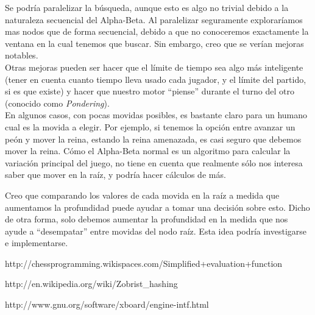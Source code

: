 \documentclass{article}
\begin{document}
Se podría paralelizar la búsqueda, aunque esto es algo no trivial
debido a la naturaleza secuencial del Alpha-Beta. Al paralelizar
seguramente exploraríamos mas nodos que de forma secuencial, debido a
que no conoceremos exactamente la ventana en la cual tenemos que buscar.
Sin embargo, creo que se verían mejoras notables.
\\

Otras mejoras pueden ser hacer que el límite de tiempo sea algo más
inteligente (tener en cuenta cuanto tiempo lleva usado cada jugador,
y el límite del partido, si es que existe) y hacer que nuestro motor
``piense'' durante el turno del otro (conocido como \emph{Pondering}).
\\

En algunos casos, con pocas movidas posibles, es bastante claro para un
humano cual es la movida a elegir. Por ejemplo, si tenemos la opción
entre avanzar un peón y mover la reina, estando la reina amenazada, es
casi seguro que debemos mover la reina. Cómo el Alpha-Beta normal es un
algoritmo para calcular la variación principal del juego, no tiene en
cuenta que realmente sólo nos interesa saber que mover en la raíz, y
podría hacer cálculos de más.

Creo que comparando los valores de cada movida en la raíz a medida que
aumentamos la profundidad puede ayudar a tomar una decisión sobre esto.
Dicho de otra forma, solo debemos aumentar la profundidad en la medida
que nos ayude a ``desempatar'' entre movidas del nodo raíz. Esta idea
podría investigarse e implementarse.

\begin{thebibliography}{9}

  http://chessprogramming.wikispaces.com/Simplified+evaluation+function

  http://en.wikipedia.org/wiki/Zobrist\_hashing

  http://www.gnu.org/software/xboard/engine-intf.html

\end{thebibliography}
\end{document}
